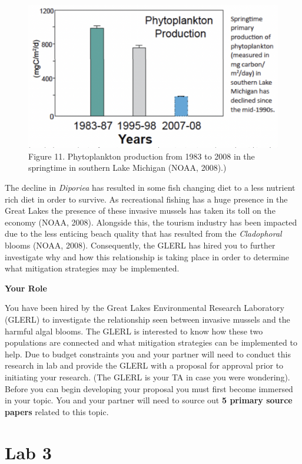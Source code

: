 \documentclass[
]{book}
\begin{document}
\begin{figure}
\centering
\includegraphics{images/figure11.png}
\caption{Figure 11. Phytoplankton production from 1983 to 2008 in the springtime in southern Lake Michigan (NOAA, 2008).)}
\end{figure}

The decline in \emph{Diporiea} has resulted in some fish changing diet to a less nutrient rich diet in order to survive. As recreational fishing has a huge presence in the Great Lakes the presence of these invasive mussels has taken its toll on the economy (NOAA, 2008). Alongside this, the tourism industry has been impacted due to the less enticing beach quality that has resulted from the \emph{Cladophoral} blooms (NOAA, 2008). Consequently, the GLERL has hired you to further investigate why and how this relationship is taking place in order to determine what mitigation strategies may be implemented.

\textbf{Your Role}

You have been hired by the Great Lakes Environmental Research Laboratory (GLERL) to investigate the relationship seen between invasive mussels and the harmful algal blooms. The GLERL is interested to know how these two populations are connected and what mitigation strategies can be implemented to help. Due to budget constraints you and your partner will need to conduct this research in lab and provide the GLERL with a proposal for approval prior to initiating your research. (The GLERL is your TA in case you were wondering). Before you can begin developing your proposal you must first become immersed in your topic. You and your partner will need to source out \textbf{5 primary source papers} related to this topic.

\hypertarget{part-lab-3}{%
\part*{Lab 3}\label{part-lab-3}}
\end{document}
